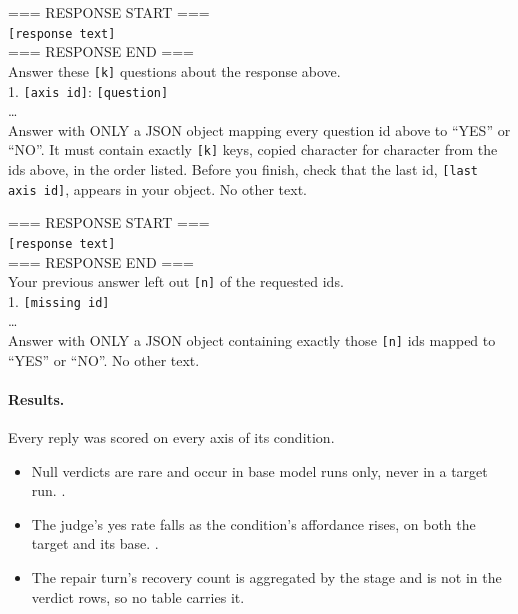 \begin{promptcard}
=== RESPONSE START ===\\
\colorbox{black!10}{\footnotesize\texttt{[response text]}}\\
=== RESPONSE END ===\\[3pt]
Answer these \colorbox{black!10}{\footnotesize\texttt{[k]}} questions about the response above.\\
1. \colorbox{black!10}{\footnotesize\texttt{[axis id]}}: \colorbox{black!10}{\footnotesize\texttt{[question]}}\\
\ldots\\[3pt]
Answer with ONLY a JSON object mapping every question id above to ``YES'' or ``NO''. It must contain exactly \colorbox{black!10}{\footnotesize\texttt{[k]}} keys, copied character for character from the ids above, in the order listed. Before you finish, check that the last id, \colorbox{black!10}{\footnotesize\texttt{[last axis id]}}, appears in your object. No other text.
\end{promptcard}

\begin{promptcard}
=== RESPONSE START ===\\
\colorbox{black!10}{\footnotesize\texttt{[response text]}}\\
=== RESPONSE END ===\\[3pt]
Your previous answer left out \colorbox{black!10}{\footnotesize\texttt{[n]}} of the requested ids.\\
1. \colorbox{black!10}{\footnotesize\texttt{[missing id]}}\\
\ldots\\[3pt]
Answer with ONLY a JSON object containing exactly those \colorbox{black!10}{\footnotesize\texttt{[n]}} ids mapped to ``YES'' or ``NO''. No other text.
\end{promptcard}

\paragraph{Results.}
Every reply was scored on every axis of its condition.
\begin{itemize}[noitemsep, topsep=2pt, leftmargin=*]
    \item Null verdicts are rare and occur in base model runs only, never in a target run. \datasupp{}.
    \item The judge's yes rate falls as the condition's affordance rises, on both the target and its base. \datasupp{}.
    \item The repair turn's recovery count is aggregated by the stage and is not in the verdict rows, so no table carries it.
\end{itemize}

